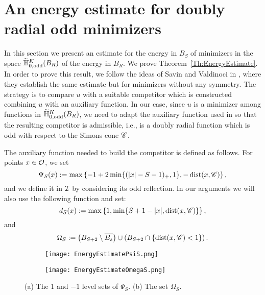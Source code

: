 \section{An energy estimate for doubly radial odd minimizers}
\label{Sec:EnergyEstimate}

In this section we present an estimate for the energy in $B_S$ of minimizers in the space $\widetilde{\mathbb{H}}^K_{0, \mathrm{odd}}(B_R)$ of the energy in $B_R$. We prove Theorem~\ref{Th:EnergyEstimate}. In order to prove this result, we follow the ideas of Savin and Valdinoci in \cite{SavinValdinoci-EnergyEstimate}, where they establish the same estimate but for minimizers without any symmetry. The strategy is to compare $u$ with a suitable competitor which is constructed combining $u$ with an auxiliary function. In our case, since $u$ is a minimizer among functions in $\widetilde{\mathbb{H}}^K_{0, \mathrm{odd}}(B_R)$, we need to adapt the auxiliary function used in \cite{SavinValdinoci-EnergyEstimate} so that the resulting competitor is admissible, i.e., is a doubly radial function which is odd with  respect to the Simons cone $\mathscr{C}$.

The auxiliary function needed to build the competitor is defined as follows. For points $x\in \mathcal{O}$, we set
$$ \Psi_S(x) := \max\left\{-1+2\min\{(|x|-S-1)_+,1\},-\operatorname{dist}(x,\mathscr{C}) \right\},  $$
and we define it in $\mathcal{I}$ by considering its odd reflection. In our arguments we will also use the following function and set:
$$ d_S(x) := \max\left\{1,\min\{S+1-|x|,\operatorname{dist}(x,\mathscr{C})\} \right\},  $$
and
\begin{equation}
\label{Eq:DefOmegaS}
\Omega_S := \left( B_{S+2}\setminus \overline{B_s} \right) \cup \left( B_{S+2} \cap \{\operatorname{dist}(x,\mathscr{C})< 1\}\right).
\end{equation} 

\begin{figure}
	\centering
	\begin{subfigure}{0.49\textwidth}
		\centering
		\texttt{[image: EnergyEstimatePsiS.png]}
	\end{subfigure}
	\begin{subfigure}{0.49\textwidth}
		\centering
		\texttt{[image: EnergyEstimateOmegaS.png]}
	\end{subfigure}
	\caption{(a) The $1$ and $-1$ level sets of $\Psi_S$. (b) The set $\Omega_S$.}
	\label{Fig:PsiSandOmegaS}
\end{figure}

